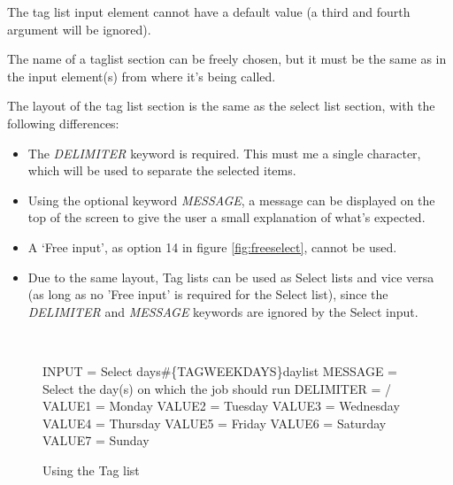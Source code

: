 \documentclass[a4paper]{book}
\newcommand{\vs}{\vspace{3mm}}
\renewcommand{\indent}{\hspace*{5mm}}
\begin{document}
\vs

The tag list input element cannot have a default value (a third and fourth 
argument will be ignored).

The name of a taglist section can be freely chosen, but it must be the same 
as in the input element(s) from where it's being called.

\vs

The layout of the tag list section is the same as the select list section, 
with the following differences:

\begin{itemize}
\item The \textsl{DELIMITER} keyword is required. This must me a single character, which 
will be used to separate the selected items.

\item Using the optional keyword \textsl{MESSAGE}, a message can be displayed on the top of 
the screen to give the user a small explanation of what's expected.

\item A `Free input', as option 14 in figure \ref{fig:freeselect}, cannot be used.

\item Due to the same layout, Tag lists can be used as Select lists and vice versa (as long as no 'Free input' is 
required for the Select list), since the \textsl{DELIMITER} and \textsl{MESSAGE} keywords are 
ignored by the Select input.
\end{itemize}

\begin{figure}[h!tb]
\begin{minipage}[h!tb]{\textwidth}
\hrulefill \\
\begin{ttfamily}
 \newline
\indent INPUT = Select days{\#}{\{}TAG\textbar WEEKDAYS{\}}daylist \newline
\noindent[WEEKDAYS] \newline
\indent MESSAGE = Select the day(s) on which the job should run \newline
\indent DELIMITER = / \newline
\indent VALUE1 = Monday \newline
\indent VALUE2 = Tuesday \newline
\indent VALUE3 = Wednesday \newline
\indent VALUE4 = Thursday \newline
\indent VALUE5 = Friday \newline
\indent VALUE6 = Saturday \newline
\indent VALUE7 = Sunday
\end{ttfamily}
\caption{Using the Tag list}\label{fig:taglist}
\hrulefill
\end{minipage}
\end{figure}
\end{document}
